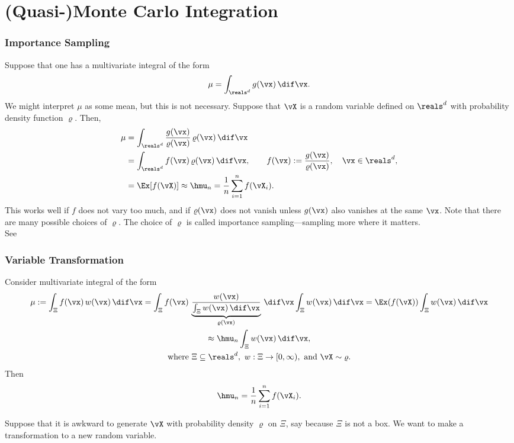\documentclass[10pt,compress,xcolor={usenames,dvipsnames}]{beamer} %
\begin{document}
\section{(Quasi-)Monte Carlo Integration}
\begin{frame}
\frametitle{Importance Sampling}
Suppose that one has a multivariate integral of the form 
\[
\mu = \int_{\reals^d} g(\vx) \, \dif \vx.
\]
We might interpret $\mu$ as some mean, but this is not necessary.  Suppose that $\vX$ is a random variable defined on $\reals^d$ with probability density function $\varrho$.   Then,
\begin{align*}
\mu &= \int_{\reals^d} \frac{g(\vx)}{\varrho(\vx)} \, \varrho(\vx) \, \dif \vx \\
& = \int_{\reals^d} f(\vx) \, \varrho(\vx) \, \dif \vx, \qquad f(\vx):= \frac{g(\vx)}{\varrho(\vx)}, \quad \vx \in \reals^d, \\
& = \Ex[f(\vX)] \approx \hmu_n = \frac 1n \sum_{i=1}^n f(\vX_i).
\end{align*}
This works well if $f$ does not vary too much, and if $\varrho(\vx)$ does not vanish 
unless $g(\vx)$ also vanishes at the same $\vx$.  Note that there are many possible 
choices of $\varrho$.  The choice of $\varrho$ is called importance 
sampling---\alert{sampling more where it matters}.  \\ \quad See 

\end{frame}

\begin{frame}
\frametitle{Variable Transformation}
Consider multivariate integral of the form 
\begin{multline*}
\mu :=  \int_{\Xi} f(\vx) \, w(\vx) \, \dif \vx  =  \int_{\Xi} f(\vx) \, 
\underbrace{\frac{w(\vx)}{\int_{\Xi} w(\vx) \, \dif \vx }}_{\varrho(\vx)} \, \dif \vx \int_{\Xi} 
w(\vx) \, \dif \vx =    \Ex(f(\vX)) \int_{\Xi} w(\vx) \, \dif \vx  \\
\approx \hmu_n \int_{\Xi} w(\vx) \, \dif \vx, \\  
\text{where }
\Xi \subseteq \reals^d, \ w : \Xi \to [0,\infty), \text{ and } \vX \sim \varrho.
\end{multline*}
Then 
\[
\hmu_n = \frac 1n \sum_{i=1}^n f(\vX_i).
\]

Suppose that it is \alert{awkward to generate} $\vX$ with probability density $\varrho$ on $\Xi$, say because $\Xi$ is not a box.  
We want to make a transformation to a new random variable. 

\end{frame}
\end{document}
